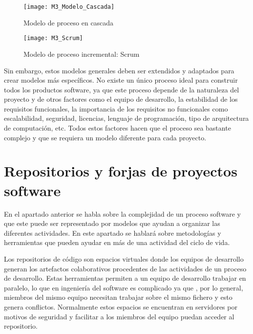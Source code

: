 \begin{figure}[!h]
	\centering
	\texttt{[image: M3\_Modelo\_Cascada]}
	\caption{Modelo de proceso en cascada \citep{noauthor_archivo:modelo_nodate}}
	\label{fig:M3_Modelo_Cascada}
\end{figure}
\FloatBarrier

\begin{figure}[!h]
	\centering
	\texttt{[image: M3\_Scrum]}
	\caption{Modelo de proceso incremental: Scrum \citep{noauthor_scrum_2019}}
	\label{fig:M3_Scrum}
\end{figure}
\FloatBarrier

Sin embargo, estos modelos generales deben ser extendidos y adaptados para crear modelos más específicos. No existe un único proceso ideal para construir todos los productos software, ya que este proceso depende de la naturaleza del proyecto y de otros factores como el equipo de desarrollo, la estabilidad de los requisitos funcionales, la importancia de los requisitos no funcionales como escalabilidad, seguridad, licencias, lenguaje de programación, tipo de arquitectura de computación, etc. Todos estos factores hacen que el proceso sea bastante complejo y que se requiera un modelo diferente para cada proyecto.

\section{Repositorios y forjas de proyectos software}


En el apartado anterior se habla sobre la complejidad de un proceso software y que este puede ser representado por modelos que ayudan a organizar las diferentes actividades. En este apartado se hablará sobre metodologías y herramientas que pueden ayudar en más de una actividad del ciclo de vida.

Los repositorios de código son espacios virtuales donde los equipos de desarrollo generan los artefactos colaborativos procedentes de las actividades de un proceso de desarrollo. Estas herramientas permiten a un equipo de desarrollo trabajar en paralelo, lo que en ingeniería del software es complicado ya que , por lo general, miembros del mismo equipo necesitan trabajar sobre el mismo fichero y esto genera conflictos. Normalmente estos espacios se encuentran en servidores por motivos de seguridad y facilitar a los miembros del equipo puedan acceder al repositorio.


